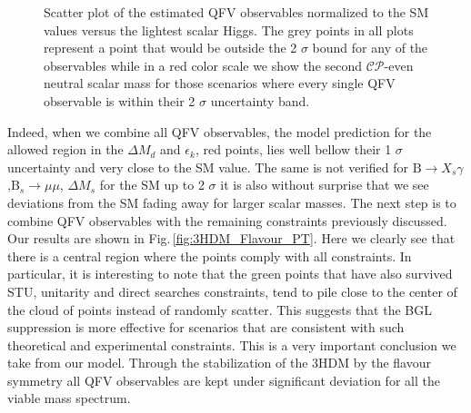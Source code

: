 \documentclass[10pt]{report}
\begin{document}
\begin{figure}[!htb]
	\caption{ Scatter plot of the estimated QFV observables normalized to the SM values versus the lightest scalar Higgs. The grey points in all plots represent a point that would be outside the 2 $\sigma$ bound for any of the observables while in a red color scale we show the second $\mathcal{CP}$-even neutral scalar mass for those scenarios where every single QFV observable is within their 2 $\sigma$ uncertainty band.}
	\label{fig:3HDM_Flavour}
\end{figure}
%
Indeed, when we combine all QFV observables, the model prediction for the allowed region in the $\Delta M_d$ and $\epsilon_k$, red points, lies well bellow their 1 $\sigma$ uncertainty and very close to the SM value. 
%
The same is not verified for $\textrm{B} \rightarrow X_s \gamma$,$\textrm{B}_s \rightarrow \mu \mu$, $\Delta M_s$ for the SM up to 2 $\sigma$ it is also without surprise that we see deviations from the SM fading away for larger scalar masses. 
%
The next step is to combine QFV observables with the remaining constraints previously discussed. Our results are shown in Fig.\,\ref{fig:3HDM_Flavour_PT}. 
%
Here we clearly see that there is a central region where the points comply with all constraints.
%
In particular, it is interesting to note that the green points that have also survived STU, unitarity and direct searches constraints, tend to pile close to the center of the cloud of points instead of randomly scatter. This suggests that the BGL suppression is more effective for scenarios that are consistent with such theoretical and experimental constraints. 
%
This is a very important conclusion we take from our model. Through the stabilization of the 3HDM by the flavour symmetry all QFV observables are kept under significant deviation for all the viable mass spectrum.  
\end{document}
